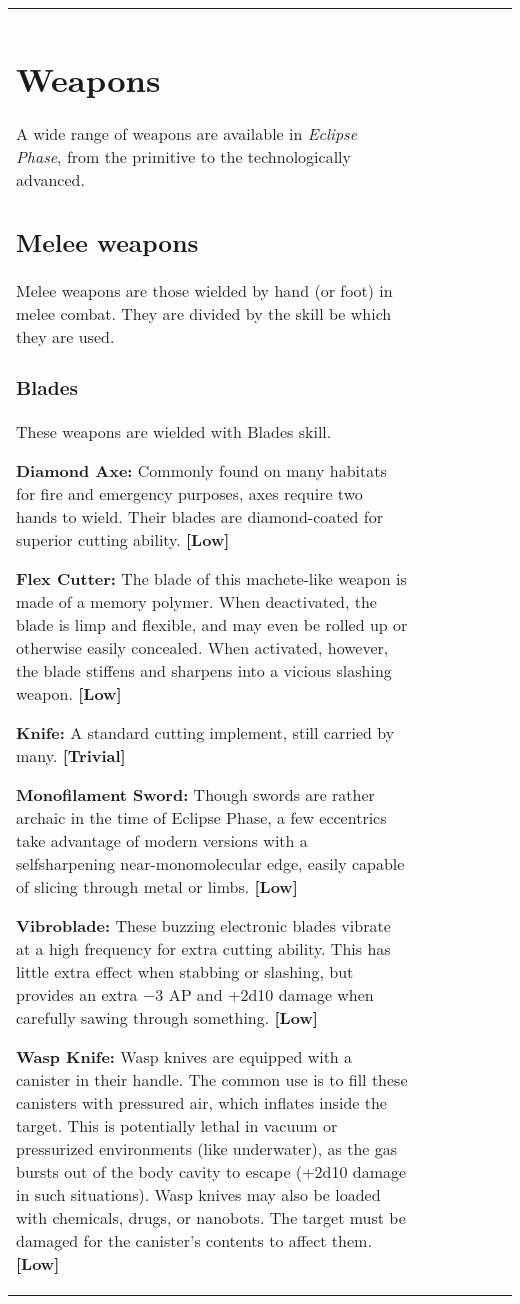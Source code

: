 \begin{tabular}{|l|l|l|l|l|l|l|}
\section{Weapons} \label{sec:weapons} 

A wide range of weapons are available in \emph{Eclipse Phase}, from the primitive to the technologically advanced. 



\subsection{Melee weapons} \label{sec:melee-weapons} 

Melee weapons are those wielded by hand (or foot) in melee combat. They are divided by the skill be which they are used. 

\subsubsection{Blades} 

These weapons are wielded with Blades skill. 

\textbf{Diamond Axe:} Commonly found on many habitats for fire and emergency purposes, axes require two hands to wield. Their blades are diamond-coated for superior cutting ability. \textbf{[Low]} 

\textbf{Flex Cutter:} The blade of this machete-like weapon is made of a memory polymer. When deactivated, the blade is limp and flexible, and may even be rolled up or otherwise easily concealed. When activated, however, the blade stiffens and sharpens into a vicious slashing weapon. \textbf{[Low]} 

\textbf{Knife:} A standard cutting implement, still carried by many. \textbf{[Trivial]} 

\textbf{Monofilament Sword:} Though swords are rather archaic in the time of Eclipse Phase, a few eccentrics take advantage of modern versions with a selfsharpening near-monomolecular edge, easily capable of slicing through metal or limbs. \textbf{[Low]} 

\textbf{Vibroblade:} These buzzing electronic blades vibrate at a high frequency for extra cutting ability. This has little extra effect when stabbing or slashing, but provides an extra $-$3 AP and +2d10 damage when carefully sawing through something. \textbf{[Low]} 

\textbf{Wasp Knife:} Wasp knives are equipped with a canister in their handle. The common use is to fill these canisters with pressured air, which inflates inside the target. This is potentially lethal in vacuum or pressurized environments (like underwater), as the gas bursts out of the body cavity to escape (+2d10 damage in such situations). Wasp knives may also be loaded with chemicals, drugs, or nanobots. The target must be damaged for the canister’s contents to affect them. \textbf{[Low]} 


\end{tabular}
